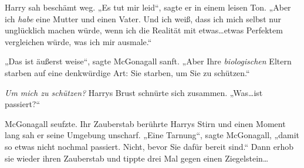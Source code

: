 Harry sah beschämt weg.
„Es tut mir leid“, sagte er in einem leisen Ton.
„Aber ich \emph{habe} eine Mutter und einen Vater. Und ich weiß, dass ich mich selbst nur unglücklich machen würde, wenn ich die Realität mit etwas…etwas Perfektem vergleichen würde, was ich mir ausmale.“

„Das ist äußerst weise“, sagte McGonagall sanft.
„Aber Ihre \emph{biologischen} Eltern starben auf eine denkwürdige Art: Sie starben, um Sie zu schützen.“

\emph{Um mich zu schützen?} Harrys Brust schnürte sich zusammen.
„Was…ist passiert?“

McGonagall seufzte. Ihr Zauberstab berührte Harrys Stirn und einen Moment lang sah er seine Umgebung unscharf.
„Eine Tarnung“, sagte McGonagall, „damit so etwas nicht nochmal passiert. Nicht, bevor Sie dafür bereit sind.“ Dann erhob sie wieder ihren Zauberstab und tippte drei Mal gegen einen Ziegelstein…

